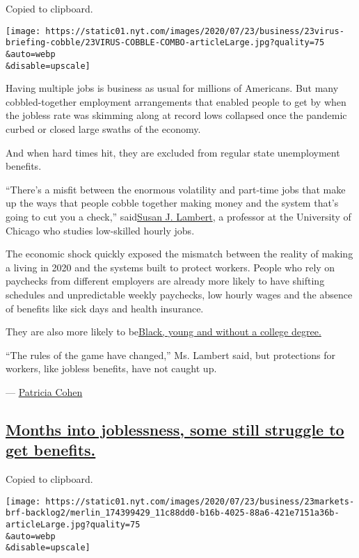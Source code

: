 Copied to clipboard.

\texttt{[image: https://static01.nyt.com/images/2020/07/23/business/23virus-briefing-cobble/23VIRUS-COBBLE-COMBO-articleLarge.jpg?quality=75\\\&auto=webp\\\&disable=upscale]}

Having multiple jobs is business as usual for millions of Americans. But
many cobbled-together employment arrangements that enabled people to get
by when the jobless rate was skimming along at record lows collapsed
once the pandemic curbed or closed large swaths of the economy.

And when hard times hit, they are excluded from regular state
unemployment benefits.

``There's a misfit between the enormous volatility and part-time jobs
that make up the ways that people cobble together making money and the
system that's going to cut you a check,''
said\href{https://ssa.uchicago.edu/ssascholars/s-lambert}{Susan J.
Lambert}, a professor at the University of Chicago who studies
low-skilled hourly jobs.

The economic shock quickly exposed the mismatch between the reality of
making a living in 2020 and the systems built to protect workers. People
who rely on paychecks from different employers are already more likely
to have shifting schedules and unpredictable weekly paychecks, low
hourly wages and the absence of benefits like sick days and health
insurance.

They are also more likely to
be\href{https://www.rsfjournal.org/content/5/4/218}{Black, young and
without a college degree.}

``The rules of the game have changed,'' Ms. Lambert said, but
protections for workers, like jobless benefits, have not caught up.

--- \href{https://www.nytimes.com/by/patricia-cohen}{Patricia Cohen}

\hypertarget{months-into-joblessness-some-still-struggle-to-get-benefits}{%
\subsection{\texorpdfstring{\protect\hyperlink{months-into-joblessness-some-still-struggle-to-get-benefits}{Months
into joblessness, some still struggle to get
benefits.}}{Months into joblessness, some still struggle to get benefits.}}\label{months-into-joblessness-some-still-struggle-to-get-benefits}}

Copied to clipboard.

\texttt{[image: https://static01.nyt.com/images/2020/07/23/business/23markets-brf-backlog2/merlin\_174399429\_11c88dd0-b16b-4025-88a6-421e7151a36b-articleLarge.jpg?quality=75\\\&auto=webp\\\&disable=upscale]}

